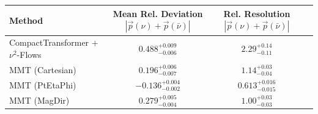     \begin{tabular}{lccc}
        \toprule
        Method & Mean Rel. Deviation $|\vec{p}(\nu) + \vec{p}(\bar{\nu})|$ & Rel. Resolution $|\vec{p}(\nu) + \vec{p}(\bar{\nu})|$ \\
        \midrule
        CompactTransformer + $\nu^2$-Flows & $0.488^{+0.009}_{-0.006}$ & $2.29^{+0.14}_{-0.11}$ \\
        MMT (Cartesian) & $0.196^{+0.006}_{-0.007}$ & $1.14^{+0.03}_{-0.04}$ \\
        MMT (PtEtaPhi) & $-0.136^{+0.004}_{-0.002}$ & $0.613^{+0.016}_{-0.015}$ \\
        MMT (MagDir) & $0.279^{+0.005}_{-0.004}$ & $1.00^{+0.03}_{-0.03}$ \\
        \bottomrule
    \end{tabular}